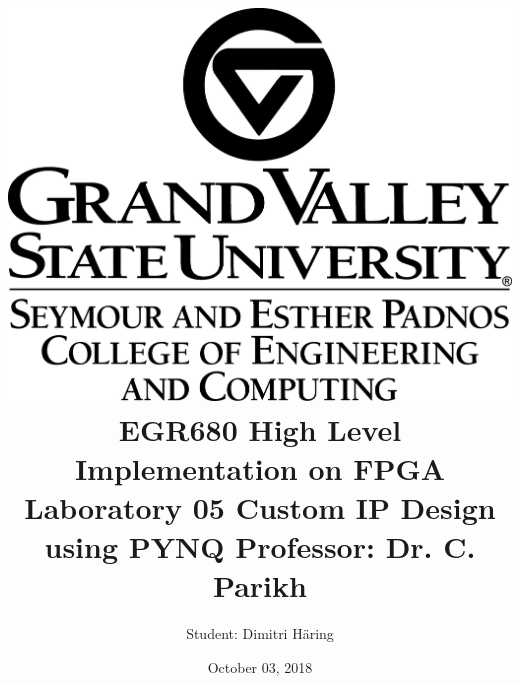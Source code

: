 \documentclass[]{article}
\title{ \includegraphics[scale=0.2]{01_images/gvsu_logo_marktop_SEPCEC_K_R.png}
		\linebreak 	\linebreak \linebreak
		EGR680 High Level Implementation on FPGA
		\linebreak \linebreak 
		Laboratory 05
		\linebreak \linebreak 
		Custom IP Design using PYNQ
		\linebreak \linebreak \linebreak
		Professor: Dr. C. Parikh
		}
\author{Student: Dimitri Häring } %
\date{October 03, 2018}
\begin{document}
\maketitle
\newpage

\tableofcontents
\pagebreak



 

\printbibliography
\end{document}
